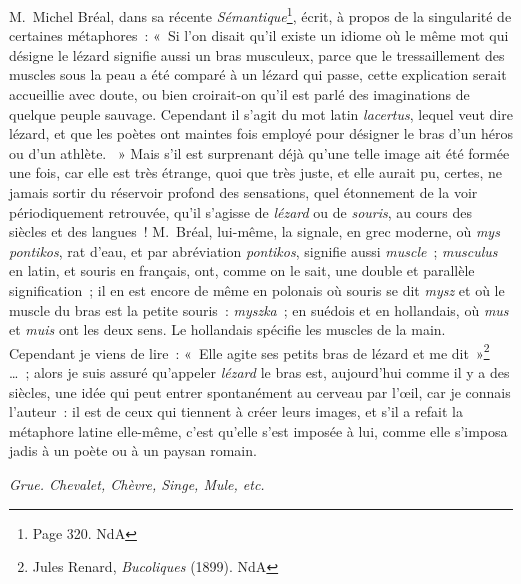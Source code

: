 \documentclass[french,twoside]{book} %
\begin{document}
\noindent M. Michel Bréal, dans sa récente {\itshape Sémantique}\footnote{ Page 320. NdA}, écrit, à propos de la singularité de certaines métaphores : « Si l’on disait qu’il existe un idiome où le même mot qui désigne le lézard signifie aussi un bras musculeux, parce que le tressaillement des muscles sous la peau a été comparé à un lézard qui passe, cette explication serait accueillie avec doute, ou bien croirait-on qu’il est parlé des imaginations de quelque peuple sauvage. Cependant il s’agit du mot latin {\itshape lacertus}, lequel veut dire lézard, et que les poètes ont maintes fois employé pour désigner le bras d’un héros ou d’un athlète.  » Mais s’il est surprenant déjà qu’une telle image ait été formée une fois, car elle est très étrange, quoi que très juste, et elle aurait pu, certes, ne jamais sortir du réservoir profond des sensations, quel étonnement de la voir périodiquement retrouvée, qu’il s’agisse de {\itshape lézard} ou de {\itshape souris}, au cours des siècles et des langues ! M. Bréal, lui-même, la signale, en grec moderne, où {\itshape mys pontikos}, rat d’eau, et par abréviation {\itshape pontikos}, signifie aussi {\itshape muscle} ; {\itshape musculus} en latin, et souris en français, ont, comme on le sait, une double et parallèle signification ; il en est encore de même en polonais où souris se dit {\itshape mysz} et où le muscle du bras est la petite souris : {\itshape myszka} ; en suédois et en hollandais, où {\itshape mus} et {\itshape muis} ont les deux sens. Le hollandais spécifie les muscles de la main. Cependant je viens de lire : « Elle agite ses petits bras de lézard et me dit »\footnote{ Jules Renard, {\itshape Bucoliques} (1899). NdA} … ; alors je suis assuré qu’appeler {\itshape lézard} le bras est, aujourd’hui comme il y a des siècles, une idée qui peut entrer spontanément au cerveau par l’œil, car je connais l’auteur : il est de ceux qui tiennent à créer leurs images, et s’il a refait la métaphore latine elle-même, c’est qu’elle s’est imposée à lui, comme elle s’imposa jadis à un poète ou à un paysan romain.\par
{\itshape Grue. Chevalet, Chèvre, Singe, Mule, etc.}\par
\end{document}
